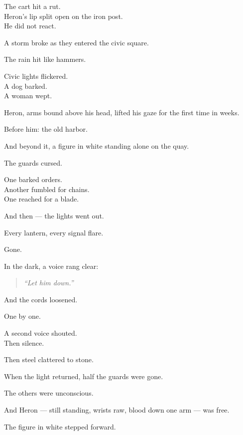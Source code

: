 \documentclass[9pt]{article}
\begin{document}
The cart hit a rut.\\
Heron’s lip split open on the iron post.\\
He did not react.

\vspace{1em}

A storm broke as they entered the civic square.

The rain hit like hammers.

Civic lights flickered.\\
A dog barked.\\
A woman wept.

Heron, arms bound above his head, lifted his gaze for the first time in weeks.

Before him: the old harbor.

And beyond it, a figure in white standing alone on the quay.

\vspace{1em}

The guards cursed.

One barked orders.\\
Another fumbled for chains.\\
One reached for a blade.

And then — the lights went out.

Every lantern, every signal flare.

Gone.

\vspace{1em}

In the dark, a voice rang clear:

\begin{quote}
\textit{“Let him down.”}
\end{quote}

And the cords loosened.

One by one.

A second voice shouted.\\
Then silence.

Then steel clattered to stone.

\vspace{1em}

When the light returned, half the guards were gone.

The others were unconscious.

And Heron — still standing, wrists raw, blood down one arm — was free.

\vspace{1em}

The figure in white stepped forward.
\end{document}
